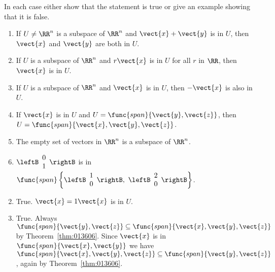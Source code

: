 \begin{multicols}{2}
\begin{ex}
In each case either show that the statement is true or give an example showing that it is false.

\begin{enumerate}[label={\alph*.}]
\item If $U \neq \RR^n$ is a subspace of $\RR^n$ and $\vect{x} + \vect{y}$ is in $U$, then $\vect{x}$ and $\vect{y}$ are both in $U$.

\item If $U$ is a subspace of $\RR^n$ and $r\vect{x}$ is in $U$ for all $r$ in $\RR$, then $\vect{x}$ is in $U$.

\item If $U$ is a subspace of $\RR^n$ and $\vect{x}$ is in $U$, then $-\vect{x}$ is also in $U$.

\item If $\vect{x}$ is in $U$ and $U = \func{span}\{\vect{y}, \vect{z}\}$, then $U = \func{span}\{\vect{x}, \vect{y}, \vect{z}\}$.

\item The empty set of vectors in $\RR^n$ is a subspace of $\RR^n$.

\item 
$\leftB \begin{array}{r}
0 \\
1
\end{array} \rightB$ is in $\func{span}
\left\{
\leftB \begin{array}{r}
1 \\
0
\end{array} \rightB,\
\leftB \begin{array}{r}
2 \\
0
\end{array} \rightB
\right\}$.

\end{enumerate}
\begin{sol}
\begin{enumerate}[label={\alph*.}]
\setcounter{enumi}{1}
\item  True. $\vect{x} = 1\vect{x}$ is in $U$.

\setcounter{enumi}{3}
\item  True. Always $\func{span}\{\vect{y}, \vect{z}\} \subseteq \func{span}\{\vect{x}, \vect{y}, \vect{z}\}$ by Theorem~\ref{thm:013606}. Since $\vect{x}$ is in $\func{span}\{\vect{x}, \vect{y}\}$ we have $\func{span}\{\vect{x}, \vect{y}, \vect{z}\}  \subseteq \func{span}\{\vect{y}, \vect{z}\}$, again by Theorem~\ref{thm:013606}.


\end{enumerate}
\end{sol}
\end{ex}
\end{multicols}
